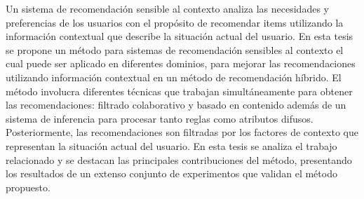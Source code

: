 
% 




Un sistema de recomendaci\'on sensible al contexto analiza  las
necesidades y preferencias de los  usuarios con el prop\'osito de
recomendar items utilizando la informaci\'on contextual que describe
la situaci\'on actual del usuario. En esta tesis se propone un
m\'etodo para sistemas de recomendaci\'on sensibles al contexto el cual 
puede ser aplicado en diferentes dominios, para mejorar las
recomendaciones utilizando informaci\'on contextual en un m\'etodo
de recomendaci\'on h\'ibrido. El m\'etodo involucra diferentes
t\'ecnicas que trabajan simult\'aneamente para obtener las
recomendaciones: filtrado colaborativo y basado en contenido adem\'as
de un sistema de inferencia para procesar tanto reglas como atributos difusos.
Posteriormente, las recomendaciones son filtradas por los factores de
contexto que representan la situaci\'on actual del usuario.
En esta tesis se analiza el trabajo relacionado y se destacan las
principales contribuciones del m\'etodo, presentando los resultados de un
extenso conjunto de experimentos que validan el m\'etodo propuesto.


